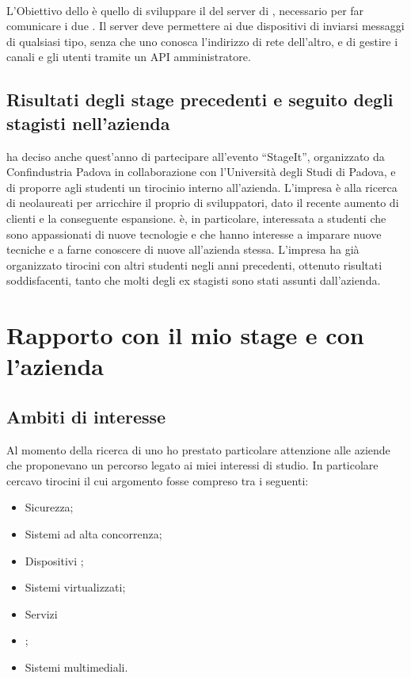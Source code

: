    \paragraph*{} L'Obiettivo dello  è quello di sviluppare il  del server di , necessario per far comunicare i due . Il server deve permettere ai due dispositivi di inviarsi messaggi di qualsiasi tipo, senza che uno conosca l'indirizzo di rete dell'altro, e di gestire i canali e gli utenti tramite un \gls{API} amministratore.
   
   \subsection{Risultati degli stage precedenti e seguito degli stagisti nell'azienda}
   \nomeAzienda{} ha deciso anche quest'anno di partecipare all'evento ``StageIt'', organizzato da Confindustria Padova in collaborazione con l'Università degli Studi di Padova, e di proporre agli studenti un tirocinio interno all'azienda. L'impresa è alla ricerca di neolaureati per arricchire il proprio  di sviluppatori, dato il recente aumento di clienti e la conseguente espansione.
   \nomeAzienda{} è, in particolare, interessata a studenti che sono appassionati di nuove tecnologie e che hanno interesse a imparare nuove tecniche e a farne conoscere di nuove all'azienda stessa.
   L'impresa ha già organizzato tirocini con altri studenti negli anni precedenti, ottenuto risultati soddisfacenti, tanto che molti degli ex stagisti sono stati assunti dall'azienda.

\section{Rapporto con il mio stage e con l'azienda}
   \subsection{Ambiti di interesse}
   Al momento della ricerca di uno  ho prestato particolare attenzione alle aziende che proponevano un percorso legato ai miei interessi di studio. In particolare cercavo tirocini il cui argomento fosse compreso tra i seguenti:
   \begin{itemize}
      \item Sicurezza;
      \item Sistemi ad alta concorrenza;
      \item Dispositivi ;
      \item Sistemi virtualizzati;
      \item Servizi  
      \item {};
      \item Sistemi multimediali.
   \end{itemize}

